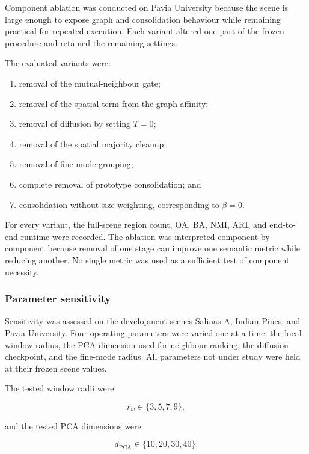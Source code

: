 \documentclass[10pt,a4paper,fleqn]{article}
\begin{document}
Component ablation was conducted on Pavia University because the scene is large
enough to expose graph and consolidation behaviour while remaining practical
for repeated execution. Each variant altered one part of the frozen procedure
and retained the remaining settings.

The evaluated variants were:

\begin{enumerate}[label=(\roman*)]
\item removal of the mutual-neighbour gate;
\item removal of the spatial term from the graph affinity;
\item removal of diffusion by setting \(T=0\);
\item removal of the spatial majority cleanup;
\item removal of fine-mode grouping;
\item complete removal of prototype consolidation; and
\item consolidation without size weighting, corresponding to
      \(\beta=0\).
\end{enumerate}

For every variant, the full-scene region count, OA, BA, NMI, ARI, and
end-to-end runtime were recorded. The ablation was interpreted component by
component because removal of one stage can improve one semantic metric while
reducing another. No single metric was used as a sufficient test of component
necessity.

\subsubsection{Parameter sensitivity}

Sensitivity was assessed on the development scenes Salinas-A, Indian Pines,
and Pavia University. Four operating parameters were varied one at a time:
the local-window radius, the PCA dimension used for neighbour ranking, the
diffusion checkpoint, and the fine-mode radius. All parameters not under study
were held at their frozen scene values.

The tested window radii were

\begin{equation}
r_w\in\{3,5,7,9\},
\label{eq:sensitivity_window}
\end{equation}

and the tested PCA dimensions were

\begin{equation}
d_{\mathrm{PCA}}
\in
\{10,20,30,40\}.
\label{eq:sensitivity_pca}
\end{equation}
\end{document}
